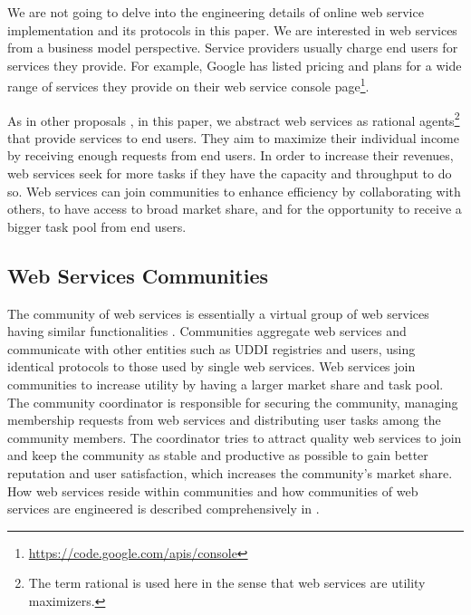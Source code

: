 \documentclass[11pt,onecolumn]{IEEEtran}
\begin{document}
We are not going to delve into the engineering details of online web service implementation and its protocols in this paper. We are interested in web services from a business model perspective. Service providers usually charge end users for services they provide. For example, Google has listed pricing and plans for a wide range of services they provide on their web service console page\footnote{\url{https://code.google.com/apis/console}}.

As in other proposals \cite{journals/mags/BaldoniBM10,10.1109/TSC.2012.12,DBLP:conf/IEEEscc/KhosravifarABT11}, in this paper, we abstract web services as rational agents\footnote{The term rational is used here in the sense that web services are utility maximizers.} that provide services to end users. They aim to maximize their individual income  by receiving enough requests from end users. In order to increase their revenues, web services seek for more tasks if they have the capacity and throughput to do so. Web services can join communities to enhance efficiency by collaborating with others, to have access to broad market share, and for the opportunity to receive a bigger task pool from end users. 

\subsection{Web Services Communities}\label{s:wsc}

The community of web services is essentially a virtual group of web services having similar functionalities \cite{DBLP:journals/ijebr/MaamarSTBB09}. Communities aggregate web services and communicate with other entities such as UDDI registries and users, using identical protocols to those used by single web services. Web services join communities to increase utility by having a larger market share and task pool. The community coordinator is responsible for securing the community, managing membership requests from web services and distributing user tasks among the community members. The coordinator tries to attract quality web services to join and keep the community as stable and productive as possible to gain better reputation and user satisfaction, which increases the community's market share. How web services reside within communities and how communities of web services are engineered is described comprehensively in \cite{DBLP:journals/ijebr/MaamarSTBB09}.
\end{document}
